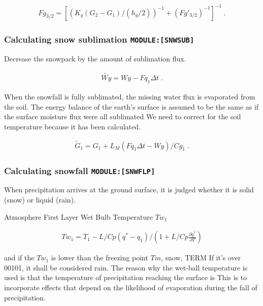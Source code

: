 \begin{eqnarray}
  Fg_{3/2} = \left[ \left( K_y (G_2-G_1)/(h_y/2) \right)^{-1} 
                    +  (Fg'_{3/2})^{-1}
                \right]^{-1} \; .
\end{eqnarray}

\hypertarget{calculating-snow-sublimation-modulesnwsub}{%
\subsubsection{\texorpdfstring{Calculating snow sublimation
\texttt{MODULE:{[}SNWSUB{]}}}{Calculating snow sublimation MODULE:{[}SNWSUB{]}}}\label{calculating-snow-sublimation-modulesnwsub}}

Decrease the snowpack by the amount of sublimation flux.

\begin{eqnarray}
  \tilde{Wy} = Wy - Fq_1 \Delta t \; .
\end{eqnarray}

When the snowfall is fully sublimated, the missing water flux is
evaporated from the soil. The energy balance of the earth's surface is
assumed to be the same as if the surface moisture flux were all
sublimated We need to correct for the soil temperature because it has
been calculated.

\begin{eqnarray}
  \tilde{G}_1 = G_1 + L_M ( Fq_1 \Delta t - Wy ) / Cg_1 \; .
\end{eqnarray}

\hypertarget{calculating-snowfall-modulesnwflp}{%
\subsubsection{\texorpdfstring{Calculating snowfall
\texttt{MODULE:{[}SNWFLP{]}}}{Calculating snowfall MODULE:{[}SNWFLP{]}}}\label{calculating-snowfall-modulesnwflp}}

When precipitation arrives at the ground surface, it is judged whether
it is solid (snow) or liquid (rain).

Atmosphere First Layer Wet Bulb Temperature \(Tw_1\)

\begin{eqnarray}
Tw_1 = T_1 - L / Cp ( q^* - q_1 ) / ( 1 + L / Cp \frac{\partial q^*}{\partial T} )
\end{eqnarray}

and if the \(Tw_1\) is lower than the freezing point \(Tm\), snow, TERM
If it's over 00101, it shall be considered rain. The reason why the
wet-ball temperature is used is that the temperature of precipitation
reaching the surface is This is to incorporate effects that depend on
the likelihood of evaporation during the fall of precipitation.

